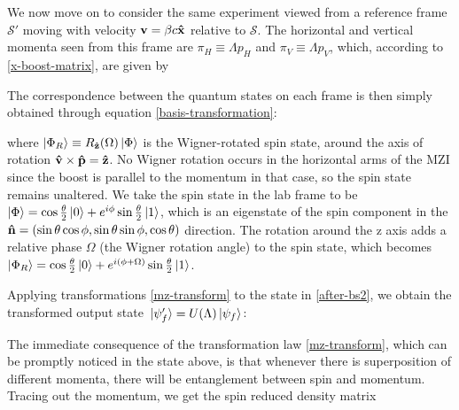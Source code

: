 \documentclass[12pt,a4paper,notitlepage]{report}
\begin{document}
We now move on to consider the same experiment viewed from a reference frame $\mathcal{S}'$ moving with velocity $\vb{v} = \beta c \vu{x}$ relative to $\mathcal{S}$. The horizontal and vertical momenta seen from this frame are $\pi_H \equiv \Lambda p_H$ and $\pi_V \equiv \Lambda p_V$, which, according to \eqref{x-boost-matrix}, are given by

%
The correspondence between the quantum states on each frame is then simply obtained through equation \eqref{basis-transformation}:

%
where $\ket{\Phi_R} \equiv R_{\vu{z}}(\Omega) \ket{\Phi}$ is the Wigner-rotated spin state, around the axis of rotation $\vu{v}\times\vu{p} = \vu{z}$. No Wigner rotation occurs in the horizontal arms of the MZI since the boost is parallel to the momentum in that case, so the spin state remains unaltered. We take the spin state in the lab frame to be $\ket{\Phi} = \cos\frac{\theta}{2}\ket{0} + e^{i\phi}\sin\frac{\theta}{2}\ket{1}$, which is an eigenstate of the spin component in the $\vu{n} = (\sin\theta\cos\phi,\sin\theta\sin\phi,\cos\theta)$ direction. The rotation around the z axis adds a relative phase $\Omega$ (the Wigner rotation angle) to the spin state, which becomes $\ket{\Phi_R} = \cos\frac{\theta}{2}\ket{0} + e^{i(\phi+\Omega)}\sin\frac{\theta}{2}\ket{1}$.

Applying transformations \eqref{mz-transform} to the state in \eqref{after-bs2}, we obtain the transformed output state $\ket*{\psi'_f}= U(\Lambda)\ket{\psi_f}$:

%
The immediate consequence of the transformation law \eqref{mz-transform}, which can be promptly noticed in the state above, is that whenever there is superposition of different momenta, there will be entanglement between spin and momentum. Tracing out the momentum, we get the spin reduced density matrix
\end{document}
